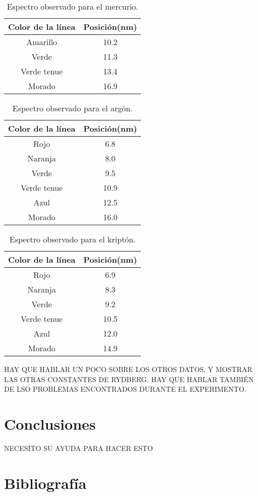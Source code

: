 \documentclass[prb,aps,twocolumn,preprintnumbers,amsmath,amssymb]{revtex4}
\begin{document}
\begin{table}[h!]
\caption{\label{Tabla 3}Espectro observado para el mercurio.}
\begin{ruledtabular}
\begin{tabular}{cc}
Color de la línea&Posición(nm)\\
\hline
Amarillo & 10.2\\
Verde & 11.3\\
Verde tenue & 13.4\\
Morado & 16.9\\
\end{tabular}
\end{ruledtabular}
\end{table}

\begin{table}[h!]
\caption{\label{Tabla 4}Espectro observado para el argón.}
\begin{ruledtabular}
\begin{tabular}{cc}
Color de la línea&Posición(nm)\\
\hline
Rojo & 6.8\\
Naranja & 8.0\\
Verde & 9.5\\
Verde tenue & 10.9\\
Azul & 12.5\\
Morado & 16.0\\
\end{tabular}
\end{ruledtabular}
\end{table}

\begin{table}[h!]
\caption{\label{Tabla 5}Espectro observado para el kriptón.}
\begin{ruledtabular}
\begin{tabular}{cc}
Color de la línea&Posición(nm)\\
\hline
Rojo & 6.9\\
Naranja & 8.3\\
Verde & 9.2\\
Verde tenue & 10.5\\
Azul & 12.0\\
Morado & 14.9\\
\end{tabular}
\end{ruledtabular}
\end{table}

HAY QUE HABLAR UN POCO SOBRE LOS OTROS DATOS, Y MOSTRAR LAS OTRAS CONSTANTES DE RYDBERG.
HAY QUE HABLAR TAMBIÉN DE LSO PROBLEMAS ENCONTRADOS DURANTE EL EXPERIMENTO.

\section{Conclusiones}

NECESITO SU AYUDA PARA HACER ESTO

\section{Bibliografía}
\end{document}
